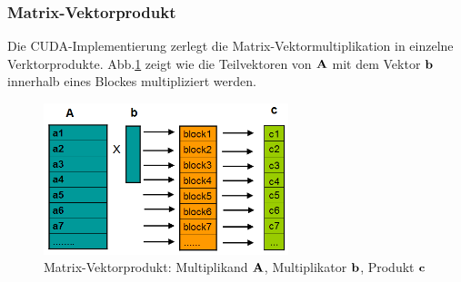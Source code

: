 

\subsubsection{Matrix-Vektorprodukt}

Die CUDA-Implementierung zerlegt die Matrix-Vektormultiplikation in einzelne
Verktorprodukte.
Abb.\ref{MatrixVektor} zeigt wie die Teilvektoren von $ \bf A$ mit dem Vektor $ \bf b$
innerhalb eines Blockes multipliziert werden.


\begin{figure}[htbp]
\centering
\includegraphics[width=2.8in]{../xby/pic//MatrixVektor}
\caption{ \label{MatrixVektor} Matrix-Vektorprodukt: Multiplikand $\bf A$, Multiplikator $ \bf b$, Produkt $\bf c$ }

\end{figure}
